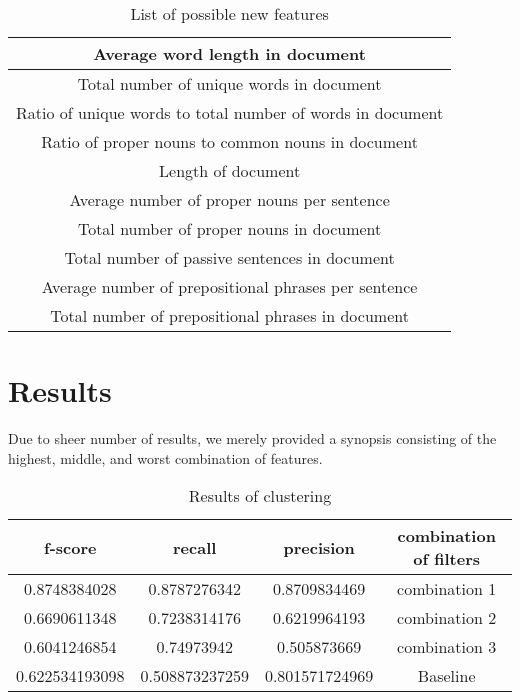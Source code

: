 \documentclass[]{article}
\begin{document}
\begin{table}[!htbp]
	\begin{center}
		\begin{tabular}{| c |} \hline
			Average word length in document \\ \hline
			Total number of unique words in document\\ \hline
			Ratio of unique words to total number of words in document \\ \hline
			Ratio of proper nouns to common nouns in document \\ \hline
			Length of document \\ \hline
			Average number of proper nouns per sentence \\ \hline
			Total number of proper nouns in document \\ \hline
			Total number of passive sentences in document \\ \hline
			Average number of prepositional phrases per sentence \\ \hline
			Total number of prepositional phrases in document \\ \hline
			
		\end{tabular}
	\end{center}
	\caption{List of possible new features}
	\label{table:features2}
\end{table}

\section{Results}

Due to sheer number of results, we merely provided a synopsis consisting of the highest, middle, and worst combination of features.

\begin{table}[!htbp]
	\begin{center}
		\begin{tabular}{| c | c | c | c |} \hline
			f-score & recall & precision & combination of filters \\
			\hline
			0.8748384028 & 0.8787276342 & 0.8709834469 & combination 1\\
			0.6690611348 & 0.7238314176 & 0.6219964193 & combination 2 \\
			0.6041246854 & 0.74973942 & 0.505873669 &	combination 3 \\
			0.622534193098 & 0.508873237259 & 0.801571724969 & Baseline \\
			\hline
		\end{tabular}
	\end{center}
	\caption{Results of clustering}
	\label{table:features2}
\end{table}
\end{document}
